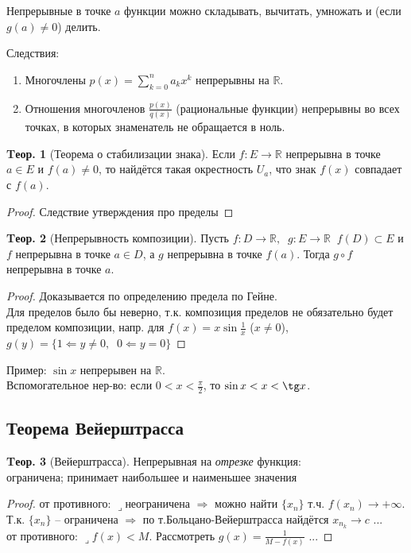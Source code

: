 \documentclass[a4paper,12pt]{article}
\numberwithin{figure}{section}
\theoremstyle{definition}
\theoremstyle{definition}
\newtheorem{theorem}{Tеор.}[section]
\def\DS{\displaystyle}
\def\RR{\mathbb{R}}
\def\.{\;\;}
\def\on{\!:}
\def\circleone{\ding{192}\space}
\def\circletwo{\ding{193}\space}
\def\lets{{\huge$\lrcorner$}\space}
\begin{document}
Непрерывные в точке $a$ функции можно складывать, вычитать, умножать и (если $g(a)\ne0$) делить.
\bigbreak

Следствия: \begin{enumerate}
	\item Многочлены $\DS p(x)=\sum_{k=0}^n a_kx^k$ непрерывны на $\RR$.
	\item Отношения многочленов $\DS \frac{p(x)}{q(x)}$ (рациональные функции)
		  непрерывны во всех точках, в которых знаменатель не обращается в ноль.
\end{enumerate}
\bigskip

\begin{theorem}[Теорема о стабилизации знака]
	Если $f\on E\to\RR$ непрерывна в точке $a \in E$ и $f(a)\ne0$,
	то найдётся такая окрестность $U_a$, что знак $f(x)$ совпадает с $f(a)$.
\end{theorem}
\begin{proof} Следствие утверждения про пределы \end{proof}
\bigskip

\begin{theorem}[Непрерывность композиции]
	Пусть $f\on D\to\RR, \. g\on E\to\RR \. f(D)\subset E$ и
	$f$ непрерывна в точке $a\in D$, а $g$ непрерывна в точке $f(a)$.
	Тогда $g \circ f$ непрерывна в точке $a$.
\end{theorem}
\begin{proof}
	Доказывается по определению предела по Гейне. \\
	Для пределов было бы неверно, т.к. композиция пределов
	не обязательно будет пределом композиции, напр. для
	$f(x)=x\sin\frac1x$ ($x\ne0$), $g(y)=\{1\Leftarrow y\ne 0 ,\. 0\Leftarrow y=0\}$
\end{proof}
\bigskip

Пример: $\sin x$ непрерывен на $\RR$. \\
Вспомогательное нер-во: если $0<x<\frac\pi2$, то $\sin x<x<\tg x$.

\subsection{Теорема Вейерштрасса}

\begin{theorem}[Вейерштрасса]
  Непрерывная на \textit{отрезке} функция: \\
	\circleone ограничена;
	\circletwo принимает наибольшее и наименьшее значения
\end{theorem}
\begin{proof}
	\circleone от противного:
	\lets неограничена $\Rightarrow$ можно найти $\{x_n\}$ т.ч. $f(x_n)\to+\infty$.
	Т.к. $\{x_n\}$ -- ограничена $\Rightarrow$ по т.Больцано-Вейерштрасса
	найдётся $x_{n_k} \to c$ ... \\
	\circletwo от противного:
	\lets $f(x)<M$. Рассмотреть $g(x)=\frac1{M-f(x)}$ ...
\end{proof}
\bigskip
\end{document}
